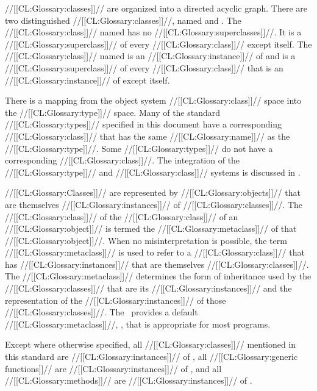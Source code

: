 //[[CL:Glossary:classes]]// are organized into a directed acyclic graph.
There are two distinguished //[[CL:Glossary:classes]]//, named  and .
The //[[CL:Glossary:class]]// named  has no //[[CL:Glossary:superclasses]]//. 
It is a //[[CL:Glossary:superclass]]// of every //[[CL:Glossary:class]]// except itself.  
The //[[CL:Glossary:class]]// named  is an //[[CL:Glossary:instance]]// of 
 and is a //[[CL:Glossary:superclass]]// of
every //[[CL:Glossary:class]]// that is an //[[CL:Glossary:instance]]// of  except itself.

There is a mapping from the object system //[[CL:Glossary:class]]// space into
the //[[CL:Glossary:type]]// space.  Many of the standard //[[CL:Glossary:types]]// specified 
in this document have a corresponding //[[CL:Glossary:class]]// that has the same 
//[[CL:Glossary:name]]// as the //[[CL:Glossary:type]]//. Some //[[CL:Glossary:types]]// do not have a
corresponding //[[CL:Glossary:class]]//. The integration of the //[[CL:Glossary:type]]// and //[[CL:Glossary:class]]//
systems is discussed in \secref\IntegratingTypesAndClasses.

//[[CL:Glossary:Classes]]// are represented by //[[CL:Glossary:objects]]// that are themselves
//[[CL:Glossary:instances]]// of //[[CL:Glossary:classes]]//. 
The //[[CL:Glossary:class]]// of the //[[CL:Glossary:class]]// of an //[[CL:Glossary:object]]// is termed
the //[[CL:Glossary:metaclass]]// of that //[[CL:Glossary:object]]//. When no misinterpretation is
possible, the term //[[CL:Glossary:metaclass]]// is used to refer to a //[[CL:Glossary:class]]//
that has //[[CL:Glossary:instances]]// that are themselves //[[CL:Glossary:classes]]//. The //[[CL:Glossary:metaclass]]//
determines the form of inheritance used by the //[[CL:Glossary:classes]]// that are its
//[[CL:Glossary:instances]]// and the representation of the //[[CL:Glossary:instances]]// of those //[[CL:Glossary:classes]]//.
The \CLOS\ provides a default //[[CL:Glossary:metaclass]]//, , that is
appropriate for most programs.



Except where otherwise specified, all //[[CL:Glossary:classes]]// mentioned in this
standard are //[[CL:Glossary:instances]]// of ,
all //[[CL:Glossary:generic functions]]// are //[[CL:Glossary:instances]]// 
of ,
and all //[[CL:Glossary:methods]]// are //[[CL:Glossary:instances]]// of .


